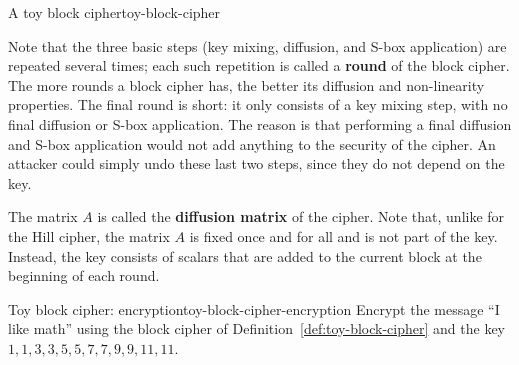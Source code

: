 \documentclass{ximera}
\begin{document}
\begin{definition}{A toy block cipher}{toy-block-cipher}
\begin{center}
\end{center}
\end{definition}

Note that the three basic steps (key mixing, diffusion, and S-box
application) are repeated several times; each such repetition is
called a \textbf{round}%
%
 of the block cipher.  The more rounds a
block cipher has, the better its diffusion and non-linearity
properties. The final round is short: it only consists of a key
mixing step, with no final diffusion or S-box application. The reason
is that performing a final diffusion and S-box application would not
add anything to the security of the cipher. An attacker could simply
undo these last two steps, since they do not depend on the key.

The matrix $A$ is called the \textbf{diffusion matrix}%
%
%
 of the cipher. Note that, unlike for
the Hill cipher, the matrix $A$ is fixed once and for all and is not
part of the key. Instead, the key consists of scalars that are added
to the current block at the beginning of each round.

\begin{example}{Toy block cipher: encryption}{toy-block-cipher-encryption}
  Encrypt the message ``I like math'' using the block cipher of
  Definition~\ref{def:toy-block-cipher} and the key
  $1,1,3,3,5,5,7,7,9,9,11,11$.
\end{example}
\end{document}
